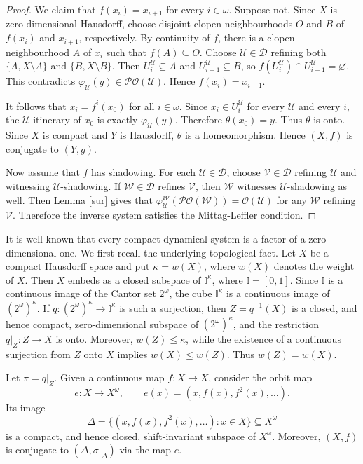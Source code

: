 \documentclass[10pt,a4paper]{amsart}
\numberwithin{equation}{section}
\def\U{{\mathcal{U}}}
\def\U{{\mathcal{U}}}
\begin{document}
\begin{proof}
We claim that $f(x_i)=x_{i+1}$ for every $i\in\omega$. Suppose not. Since $X$
is zero-dimensional Hausdorff, choose disjoint clopen neighbourhoods $O$ and
$B$ of $f(x_i)$ and $x_{i+1}$, respectively. By continuity of $f$, there is a
clopen neighbourhood $A$ of $x_i$ such that $f(A)\subseteq O$. Choose
$\mathcal U\in\mathcal D$ refining both $\{A,X\setminus A\}$ and
$\{B,X\setminus B\}$. Then $U_i^{\mathcal U}\subseteq A$ and
$U_{i+1}^{\mathcal U}\subseteq B$, so
$f(U_i^{\mathcal U})\cap U_{i+1}^{\mathcal U}=\varnothing$. This contradicts
$\varphi_{\mathcal U}(y)\in\mathcal{PO}(\mathcal U)$. Hence
$f(x_i)=x_{i+1}$.

It follows that $x_i=f^i(x_0)$ for all $i\in\omega$. Since
$x_i\in U_i^{\mathcal U}$ for every $\mathcal U$ and every $i$, the
$\mathcal U$-itinerary of $x_0$ is exactly $\varphi_{\mathcal U}(y)$. Therefore
$\theta(x_0)=y$. Thus $\theta$ is onto. Since $X$ is compact and $Y$ is
Hausdorff, $\theta$ is a homeomorphism. Hence $(X,f)$ is conjugate to
$(Y,g)$.

Now assume that $f$ has shadowing. For each $\mathcal U\in\mathcal D$, choose
$\mathcal V\in\mathcal D$ refining $\mathcal U$ and witnessing
$\mathcal U$-shadowing.
If $\mathcal W\in\mathcal D$ refines $\mathcal V$, then $\mathcal W$ witnesses $\mathcal U$-shadowing as well.
Then Lemma \ref{sur} gives that
$\varphi_{\mathcal U}^{\mathcal W}(\mathcal{PO}(\mathcal W))
=
\mathcal{O}(\U)$ for any $\mathcal W$ refining $\mathcal V$. Therefore the inverse system
satisfies the Mittag-Leffler condition.
\end{proof}



It is well known that every compact dynamical system is a factor of a
zero-dimensional one. We first recall the underlying topological fact. Let
$X$ be a compact Hausdorff space and put $\kappa=w(X)$, where $w(X)$ denotes the weight of $X$. Then $X$ embeds as a
closed subspace of $\mathbb I^\kappa$, where $\mathbb I=[0,1]$. Since
$\mathbb I$ is a continuous image of the Cantor set $2^\omega$, the cube
$\mathbb I^\kappa$ is a continuous image of $(2^\omega)^\kappa$. If
$q:(2^\omega)^\kappa\to\mathbb I^\kappa$ is such a surjection, then
$
Z=q^{-1}(X)
$
is a closed, and hence compact, zero-dimensional subspace of
$(2^\omega)^\kappa$, and the restriction $q|_Z:Z\to X$ is onto. Moreover,
$w(Z)\leq\kappa$, while the existence of a continuous surjection from $Z$ onto
$X$ implies $w(X)\leq w(Z)$. Thus $w(Z)=w(X)$.


Let $\pi = q|_Z$. Given a continuous map
$f:X\to X$, consider the orbit map
\[
    e:X\to X^\omega,\qquad e(x)=(x,f(x),f^2(x),\ldots).
\]
Its image
\[
    \Delta=\{(x,f(x),f^2(x),\ldots):x\in X\}\subseteq X^\omega
\]
is a compact, and hence closed, shift-invariant subspace of $X^\omega$. Moreover,
$(X,f)$ is conjugate to $(\Delta,\sigma|_\Delta)$ via the map $e$.
\end{document}
